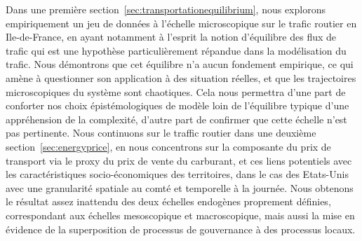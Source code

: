 

Dans une première section~\ref{sec:transportationequilibrium}, nous explorons empiriquement un jeu de données à l'échelle microscopique sur le trafic routier en Ile-de-France, en ayant notamment à l'esprit la notion d'équilibre des flux de trafic qui est une hypothèse particulièrement répandue dans la modélisation du trafic. Nous démontrons que cet équilibre n'a aucun fondement empirique, ce qui amène à questionner son application à des situation réelles, et que les trajectoires microscopiques du système sont chaotiques. Cela nous permettra d'une part de conforter nos choix épistémologiques de modèle loin de l'équilibre typique d'une appréhension de la complexité, d'autre part de confirmer que cette échelle n'est pas pertinente. Nous continuons sur le traffic routier dans une deuxième section~\ref{sec:energyprice}, en nous concentrons sur la composante du prix de transport via le proxy du prix de vente du carburant, et ces liens potentiels avec les caractéristiques socio-économiques des territoires, dans le cas des Etats-Unis avec une granularité spatiale au comté et temporelle à la journée. Nous obtenons le résultat assez inattendu des deux échelles endogènes proprement définies, correspondant aux échelles mesoscopique et macroscopique, mais aussi la mise en évidence de la superposition de processus de gouvernance à des processus locaux.




\stars







